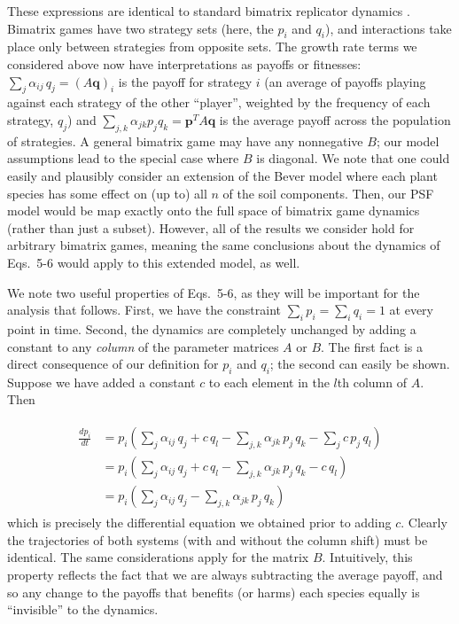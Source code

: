 \documentclass[11pt]{article}
\begin{document}
These expressions are identical to standard bimatrix replicator dynamics \citep{hofbauer1996evolutionary,hofbauer1998evolutionary}. Bimatrix games have two strategy sets (here, the $p_i$ and $q_i$), and interactions take place only between strategies from opposite sets. The growth rate terms we considered above now have interpretations as payoffs or fitnesses: $\sum_{j} \alpha_{ij} \, q_j = (A \bm{q})_i$ is the payoff for strategy $i$ (an average of payoffs playing against each strategy of the other ``player'', weighted by the frequency of each strategy, $q_j$) and $\sum_{j, k} \alpha_{jk} p_j  q_k = \bm{p}^T A \bm{q}$ is the average payoff across the population of strategies. A general bimatrix game may have any nonnegative $B$; our model assumptions lead to the special case where $B$ is diagonal. We note that one could easily and plausibly consider an extension of the Bever model where each plant species has some effect on (up to) all $n$ of the soil components. Then, our PSF model would be map exactly onto the full space of bimatrix game dynamics (rather than just a subset). However, all of the results we consider hold for arbitrary bimatrix games, meaning the same conclusions about the dynamics of Eqs.~5-6 would apply to this extended model, as well. 

We note two useful properties of Eqs.~5-6, as they will be important for the analysis that follows. First, we have the constraint $\sum_i p_i = \sum_i q_i = 1$ at every point in time. Second, the dynamics are completely unchanged by adding a constant to any \emph{column} of the parameter matrices $A$ or $B$. The first fact is a direct consequence of our definition for $p_i$ and $q_i$; the second can easily be shown. Suppose we have added a constant $c$ to each element in the $l$th column of $A$. Then

\begin{align}
\begin{split}
\frac{dp_i}{dt} &= p_i \left(\sum_{j} \alpha_{ij} \, q_j + c \, q_l - \sum_{j, k} \alpha_{jk} \, p_j \, q_k - \sum_{j} c \, p_j \, q_l \right)\\
&= p_i \left(\sum_{j} \alpha_{ij} \, q_j + c \, q_l - \sum_{j, k} \alpha_{jk} \, p_j \, q_k - c \, q_l \right) \\
&= p_i \left(\sum_{j} \alpha_{ij} \, q_j - \sum_{j, k} \alpha_{jk} \, p_j \, q_k \right)
\end{split}
\end{align}
which is precisely the differential equation we obtained prior to adding $c$. Clearly the trajectories of both systems (with and without the column shift) must be identical. The same considerations apply for the matrix $B$. Intuitively, this property reflects the fact that we are always subtracting the average payoff, and so any change to the payoffs that benefits (or harms) each species equally is ``invisible'' to the dynamics.
\end{document}

